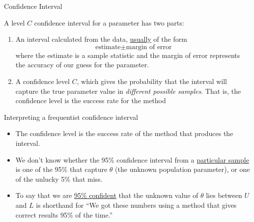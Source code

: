 \documentclass{beamer}\usepackage[]{graphicx}\usepackage[]{color}
\newcommand {\framedgraphic}[1] {
	\begin{figure}
		\centering
		\texttt{[image: \#1]}
	\end{figure}
}
\begin{document}
\begin{frame}{Confidence Interval}

\begin{defm}
	A level $C$ confidence interval for a parameter has two parts:
	\begin{enumerate}
		\item An interval calculated from the data, \underline{usually} of the form $$\textrm{estimate} \pm \textrm{margin of error}$$ where the estimate is a sample statistic and the margin of error represents the accuracy of our guess for the parameter.
		\item A confidence level $C$, which gives the probability that the interval will capture the true parameter value in \textit{different possible samples}. That is, the confidence level is the success rate for the method
	\end{enumerate}
\end{defm}


\end{frame}



\begin{frame}{Interpreting a frequentist confidence interval}
\begin{itemize}
	\setlength\itemsep{1em}
	\item The confidence level is the success rate of the method that produces the interval. \pause
	\item We don't know whether the 95\% confidence interval from a \underline{particular
		sample} is one of the 95\% that capture $\theta$ (the unknown population parameter), or one of the unlucky 5\% that miss. \pause
	\item To say that we are \underline{95\% confident} that the unknown value of $\theta$
	lies between $U$ and $L$ is shorthand for ``We got these numbers using a
	method that gives correct results 95\% of the time.''
\end{itemize}
\end{frame}
\end{document}
